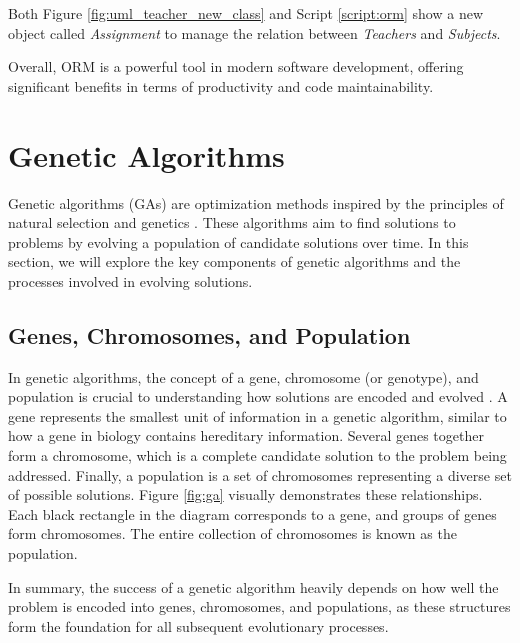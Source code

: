  Both Figure \ref{fig:uml_teacher_new_class} and Script \ref{script:orm}
 show a new object called \textit{Assignment} to manage the relation between \textit{Teachers} and \textit{Subjects}.


Overall, ORM is a powerful tool in modern software development, offering significant benefits in terms of productivity and code maintainability. %

    \section{Genetic Algorithms} \label{sec:ga}
    
    Genetic algorithms (GAs) are optimization methods inspired by the principles of natural selection and genetics \cite{holland1992adaptation}. These algorithms aim to find solutions to problems by evolving a population of candidate solutions over time. In this section, we will explore the key components of genetic algorithms and the processes involved in evolving solutions.
    
    \subsection{Genes, Chromosomes, and Population}
    
        In genetic algorithms, the concept of a gene, chromosome (or genotype), and population is crucial to understanding how solutions are encoded and evolved \cite{holland1992adaptation}. 
        A gene represents the smallest unit of information in a genetic algorithm, similar to how a gene in biology contains hereditary information. 
        Several genes together form a chromosome, which is a complete candidate solution to the problem being addressed. 
        Finally, a population is a set of chromosomes representing a diverse set of possible solutions.
        Figure \ref{fig:ga} visually demonstrates these relationships. 
        Each black rectangle in the diagram corresponds to a gene, and groups of genes form chromosomes. 
        The entire collection of chromosomes is known as the population.
        
        
        
        In summary, the success of a genetic algorithm heavily depends on how well the problem is encoded into genes, chromosomes, and populations, as these structures form the foundation for all subsequent evolutionary processes.
    
